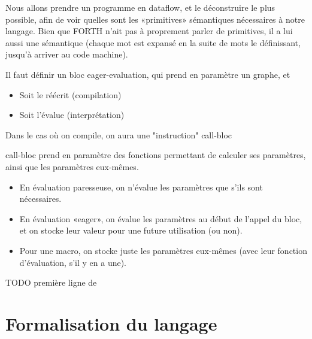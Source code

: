 \documentclass{article}
\begin{document}
{Nous allons prendre un programme en dataflow, et le déconstruire le plus possible, afin de voir quelles sont les «primitives» sémantiques nécessaires à notre langage. Bien que FORTH n'ait pas à proprement parler de primitives, il a lui aussi une sémantique (chaque mot est expansé en la suite de mots le définissant, jusqu'à arriver au code machine).
  

Il faut définir un bloc eager-evaluation, qui prend en paramètre un graphe, et
\begin{itemize}
\item Soit le réécrit (compilation)
\item Soit l'évalue (interprétation)
\end{itemize}
Dans le cas où on compile, on aura une "instruction" call-bloc

call-bloc prend en paramètre des fonctions permettant de calculer ses paramètres, ainsi que les paramètres eux-mêmes.
\begin{itemize}
\item En évaluation paresseuse, on n'évalue les paramètres que s'ils sont nécessaires.
\item En évaluation «eager», on évalue les paramètres au début de l'appel du bloc, et on stocke leur valeur pour une future utilisation (ou non).
\item Pour une macro, on stocke juste les paramètres eux-mêmes (avec leur fonction d'évaluation, s'il y en a une).
\end{itemize}

TODO première ligne de \section{Formalisation du langage}
}
\end{document}
